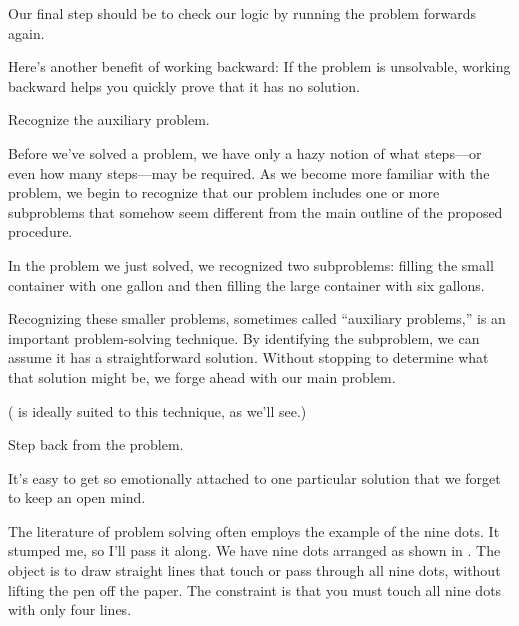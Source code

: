 




Our final step should be to check our logic by running the problem
forwards again.

Here's another benefit of working backward:
If the problem is unsolvable,
working backward helps you quickly prove that it has no solution.

\begin{tip}
Recognize the auxiliary problem.
\end{tip}
Before we've solved a problem, we have only a hazy notion of what
steps---or even how many steps---may be required. As we become more
familiar with the problem, we begin to recognize that our problem
includes one or more subproblems that somehow seem different from the
main outline of the proposed procedure.

In the problem we just solved, we recognized two subproblems: filling
the small container with one gallon and then filling the large container
with six gallons.

Recognizing these smaller problems, sometimes called
``auxiliary problems,''
is an important problem-solving technique. By identifying
the subproblem, we can assume it has a straightforward solution.
Without stopping to determine what that solution might be, we forge
ahead with our main problem.

(\Forth{} is ideally suited to this technique, as we'll see.)

\begin{tip}
Step back from the problem.
\end{tip}
It's easy to get so emotionally attached to one particular solution that we
forget to keep an open mind.

The literature of problem solving often employs the example of the
nine dots. It stumped me, so I'll pass it along. We have nine dots arranged
as shown in . The object is to draw straight lines that
touch or pass through all nine dots, without lifting the pen off the paper.
The constraint is that you must touch all nine dots with only four lines.


